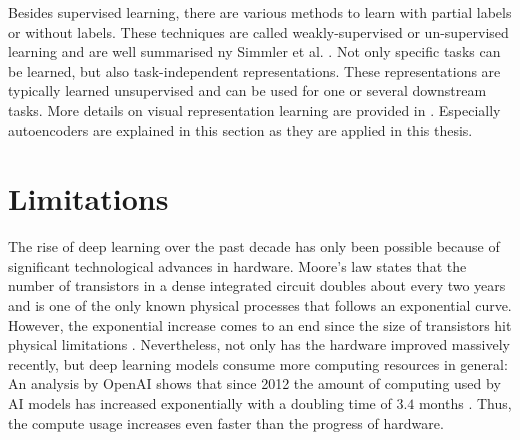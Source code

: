 Besides supervised learning, there are various methods to learn with partial labels or without labels.
These techniques are called weakly-supervised or un-supervised learning and are well summarised ny Simmler et al. .
Not only specific tasks can be learned, but also task-independent representations.
These representations are typically learned unsupervised and can be used for one or several downstream tasks.
More details on visual representation learning are provided in .
Especially autoencoders  are explained in this section as they are applied in this thesis.


\section{Limitations}
The rise of deep learning over the past decade has only been possible because of significant technological advances in hardware.
Moore's law  states that the number of transistors in a dense integrated circuit doubles about every two years and is one of the only known physical processes that follows an exponential curve.
However, the exponential increase comes to an end since the size of transistors hit physical limitations .
Nevertheless, not only has the hardware improved massively recently, but deep learning models consume more computing resources in general:
An analysis by OpenAI shows that since 2012 the amount of computing used by AI models has increased exponentially with a doubling time of \(3.4\) months .
Thus, the compute usage increases even faster than the progress of hardware.

